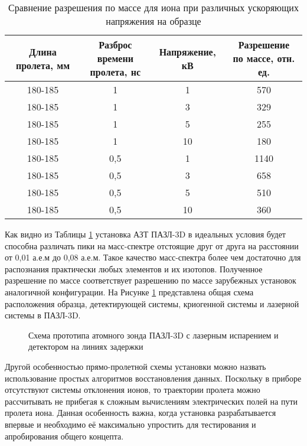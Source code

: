 \begin{table} [htbp]
	\centering
	\caption{Сравнение разрешения по массе для иона при различных ускоряющих напряжения на образце}
	\label{tab:calcFWHM}
	\begin{SingleSpace}
		\begin{tabular} {| c | c | c | c |}
			\hline
			Длина пролета, мм & \thead{Разброс времени\\ пролета, нс} & Напряжение, кВ & \thead{Разрешение \\по массе, отн. ед.}  \\ \hline
			180-185 & 1 & 1  &  570               \\ \hline
			180-185 & 1 & 3  &  329               \\ \hline
			180-185 & 1 & 5  &  255               \\ \hline
			180-185 & 1 & 10 &  180               \\ \hline
			180-185 & 0,5 & 1  &  1140               \\ \hline
			180-185 & 0,5 & 3  &  658               \\ \hline
			180-185 & 0,5 & 5  &  510               \\ \hline
			180-185 & 0,5 & 10 &  360               \\ \hline
		\end{tabular}
	\end{SingleSpace}
\end{table}

Как видно из Таблицы \cref{tab:calcFWHM} установка АЗТ ПАЗЛ-3D в идеальных условия будет способна различать пики на масс-спектре отстоящие друг от друга на расстоянии от 0,01 а.е.м до 0,08 а.е.м. Такое качество масс-спектра более чем достаточно для распознания практически любых элементов и их изотопов. Полученное разрешение по массе соответствует разрешению по массе зарубежных установок аналогичной конфигурации.
На Рисунке \cref{fig:main_scheme} представлена общая схема расположения образца, детектирующей системы, криогенной системы и лазерной системы в ПАЗЛ-3D.
\begin{figure}[htb]
	\caption{Схема прототипа атомного зонда ПАЗЛ-3D с лазерным испарением и детектором на линиях задержки}
	\label{fig:main_scheme}
\end{figure}
  
Другой особенностью прямо-пролетной схемы установки можно назвать использование простых алгоритмов восстановления данных. Поскольку в приборе отсутствуют системы отклонения ионов, то траектории пролета можно рассчитывать не прибегая к сложным вычислениям электрических полей на пути пролета иона. Данная особенность важна, когда установка разрабатывается впервые и необходимо её максимально упростить для тестирования и апробирования общего концепта.

